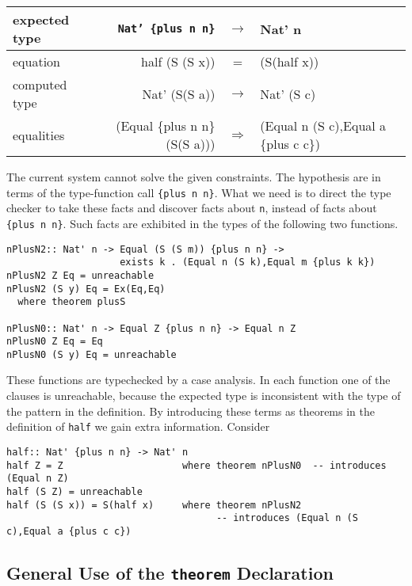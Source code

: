 \documentclass[11pt,twoside]{article}
\newcommand{\plus}[2]{\{plus {#1} {#2}\}}
\begin{document}
\vspace*{.1in}
\begin{tabular}{|l|rcl|} \hline
{\small expected type} & {\small{\tt Nat' \plus{n}{n}}} & $\rightarrow$ & {\small Nat' n} \\ \hline
{\small equation} & {\small half (S (S x))} & =             & {\small (S(half x))} \\ \hline
{\small computed type} & {\small Nat' (S(S a))} & $\rightarrow$ & {\small Nat' (S c)} \\ \hline
{\small equalities}    & {\small (Equal \plus{n}{n} (S(S a)))} & $\Rightarrow$ & {\small (Equal n (S c),Equal a \plus{c}{c})} \\ \hline 
\end{tabular}
\vspace*{.1in}

The current system cannot solve the given constraints.  The hypothesis are in terms
of the type-function call \verb+{plus n n}+. What we need is to direct
the type checker to take these facts and discover facts about \verb+n+, instead
of facts about \verb+{plus n n}+. Such facts are exhibited in the types of the following
two functions.

\begin{verbatim}
nPlusN2:: Nat' n -> Equal (S (S m)) {plus n n} -> 
                    exists k . (Equal n (S k),Equal m {plus k k})
nPlusN2 Z Eq = unreachable
nPlusN2 (S y) Eq = Ex(Eq,Eq)  
  where theorem plusS
  
nPlusN0:: Nat' n -> Equal Z {plus n n} -> Equal n Z
nPlusN0 Z Eq = Eq
nPlusN0 (S y) Eq = unreachable
\end{verbatim}

These functions are typechecked by a case analysis. In each
function one of the clauses is unreachable, because the expected type is inconsistent
with the type of the pattern in the definition. By introducing these
terms as theorems in the definition of {\tt half} we gain extra information.
Consider

\begin{verbatim}
half:: Nat' {plus n n} -> Nat' n
half Z = Z                     where theorem nPlusN0  -- introduces (Equal n Z)
half (S Z) = unreachable
half (S (S x)) = S(half x)     where theorem nPlusN2  
                                     -- introduces (Equal n (S c),Equal a {plus c c})
\end{verbatim}

\subsection{General Use of the {\tt theorem} Declaration}
\end{document}
